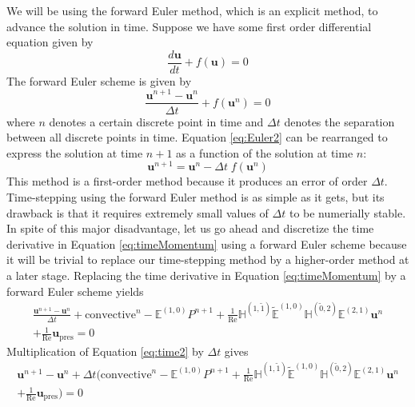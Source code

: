 We will be using the forward Euler method, which is an explicit method, to advance the solution in time. Suppose we have some first order differential equation given by
\begin{equation}
    \label{eq:Euler1}
    \frac{d \mathbf{u}}{dt} + f(\mathbf{u}) = 0
\end{equation}
The forward Euler scheme is given by
\begin{equation}
    \label{eq:Euler2}
    \frac{\mathbf{u}^{n+1} - \mathbf{u}^{n}}{\Delta t} + f(\mathbf{u}^{n}) = 0
\end{equation}
where $n$ denotes a certain discrete point in time and $\Delta t$ denotes the separation between all discrete points in time. Equation \eqref{eq:Euler2} can be rearranged to express the solution at time $n+1$ as a function of the solution at time $n$:
\begin{equation}
    \label{eq:time1}
    \mathbf{u}^{n+1} = \mathbf{u}^{n} - \Delta t \; f(\mathbf{u}^{n})
\end{equation}
This method is a first-order method because it produces an error of order $\Delta t$. Time-stepping using the forward Euler method is as simple as it gets, but its drawback is that it requires extremely small values of $\Delta t$ to be numerially stable. In spite of this major disadvantage, let us go ahead and discretize the time derivative in Equation \eqref{eq:timeMomentum} using a forward Euler scheme because it will be trivial to replace our time-stepping method by a higher-order method at a later stage. Replacing the time derivative in Equation \eqref{eq:timeMomentum} by a forward Euler scheme yields
\begin{multline}
    \label{eq:time2}
    \frac{\mathbf{u}^{n+1} - \mathbf{u}^{n}}{\Delta t} + \text{convective}^{n} - \mathbb{E}^{(1,0)} P^{n+1} + \frac{1}{\text{Re}} \mathbb{H}^{(1,\tilde{1})} \tilde{\mathbb{E}}^{(1,0)} \mathbb{H}^{(\tilde{0},2)} \mathbb{E}^{(2,1)} \mathbf{u}^{n} \\
    + \frac{1}{\text{Re}} \mathbf{u}_{\text{pres}} = 0
\end{multline}
Multiplication of Equation \eqref{eq:time2} by $\Delta t$ gives
\begin{multline}
    \label{eq:time3}
    \mathbf{u}^{n+1} - \mathbf{u}^{n} + \Delta t \biggl( \text{convective}^{n} - \mathbb{E}^{(1,0)} P^{n+1} + \frac{1}{\text{Re}} \mathbb{H}^{(1,\tilde{1})} \tilde{\mathbb{E}}^{(1,0)} \mathbb{H}^{(\tilde{0},2)} \mathbb{E}^{(2,1)} \mathbf{u}^{n} \\
    + \frac{1}{\text{Re}} \mathbf{u}_{\text{pres}} \biggr) = 0
\end{multline}

